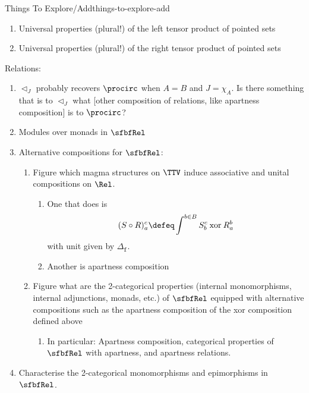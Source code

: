 \begin{remark}{Things To Explore/Add}{things-to-explore-add}
\begin{enumerate}
\begin{enumerate}
            \end{enumerate}
        \item Universal properties (plural!) of the left tensor product of pointed sets
        \item Universal properties (plural!) of the right tensor product of pointed sets
    \end{enumerate}
    Relations:
    \begin{enumerate}
        \item $\lhd_{J}$ probably recovers $\procirc$ when $A=B$ and $J=\chi_{A}$. Is there something that is to $\lhd_{J}$ what [other composition of relations, like apartness composition] is to $\procirc$?
        \item Modules over monads in $\sfbfRel$
        \item Alternative compositions for $\sfbfRel$:
            \begin{enumerate}
                \item Figure which magma structures on $\TTV$ induce associative and unital compositions on $\Rel$.
                    \begin{enumerate}
                        \item One that does is
                            \[
                                (S\circ R)^{c}_{a}%
                                \defeq%
                                \int^{b\in B}S^{c}_{b}\mathbin{\text{xor}}R^{b}_{a}%
                            \]%
                            with unit given by $\Delta_{\mathtt{f}}$.
                        \item Another is apartness composition
                    \end{enumerate}
                \item Figure what are the 2-categorical properties (internal monomorphisms, internal adjunctions, monads, etc.) of $\sfbfRel$ equipped with alternative compositions such as the apartness composition of the xor composition defined above
                    \begin{enumerate}
                        \item In particular: Apartness composition, categorical properties of $\sfbfRel$ with apartness, and apartness relations.
                    \end{enumerate}
            \end{enumerate}
        \item Characterise the 2-categorical monomorphisms and epimorphisms in $\sfbfRel$.

\end{enumerate}
\end{remark}

